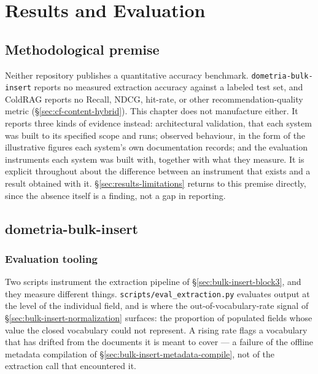 \chapter{Results and Evaluation}
\label{ch:results}

\section{Methodological premise}
\label{sec:results-premise}

Neither repository publishes a quantitative accuracy benchmark. \texttt{dometria-bulk-insert} reports no measured extraction accuracy against a labeled test set, and ColdRAG reports no Recall, NDCG, hit-rate, or other recommendation-quality metric (\S\ref{sec:cf-content-hybrid}). This chapter does not manufacture either. It reports three kinds of evidence instead: architectural validation, that each system was built to its specified scope and runs; observed behaviour, in the form of the illustrative figures each system's own documentation records; and the evaluation instruments each system was built with, together with what they measure. It is explicit throughout about the difference between an instrument that exists and a result obtained with it. \S\ref{sec:results-limitations} returns to this premise directly, since the absence itself is a finding, not a gap in reporting.

\section{dometria-bulk-insert}
\label{sec:results-bulk-insert}

\subsection{Evaluation tooling}
\label{sec:results-bulk-insert-tooling}

Two scripts instrument the extraction pipeline of \S\ref{sec:bulk-insert-block3}, and they measure different things. \texttt{scripts/eval\_extraction.py} evaluates output at the level of the individual field, and is where the out-of-vocabulary-rate signal of \S\ref{sec:bulk-insert-normalization} surfaces: the proportion of populated fields whose value the closed vocabulary could not represent. A rising rate flags a vocabulary that has drifted from the documents it is meant to cover — a failure of the offline metadata compilation of \S\ref{sec:bulk-insert-metadata-compile}, not of the extraction call that encountered it.


